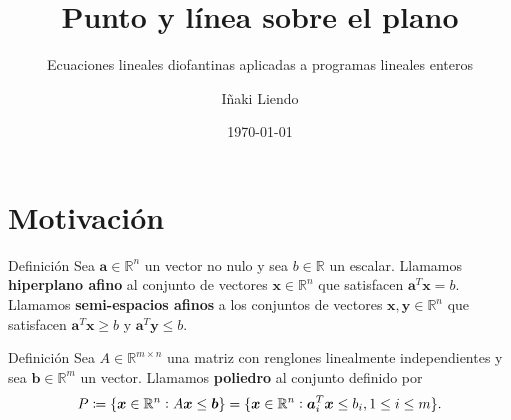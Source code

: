 \documentclass[aspectratio=169,professionalfonts]{beamer}
\title[Punto y línea sobre el plano]{Punto y línea sobre el plano}
\subtitle{Ecuaciones lineales diofantinas aplicadas a programas lineales enteros}
\author[Iñaki Liendo]{Iñaki Liendo}
\institute[ITAM]{Coloquio de matemáticas}
\date{\today}
\newcommand{\R}{\mathbb{R}}
\renewcommand{\vec}[1]{\boldsymbol{#1}}
\newcommand{\braces}[1]{\lbrace #1 \rbrace}
\begin{document}
\begin{frame}[plain]
	\titlepage
\end{frame}

\section{Motivación}
\begin{frame}
	\begin{block}{Definición}
		Sea $\vec{a} \in \R^n$ un vector no nulo y sea $b \in \R$ un escalar. Llamamos
		\textbf{hiperplano afino} al conjunto de vectores $\vec{x} \in \R^n$ que satisfacen
		$\vec{a}^T\vec{x} = b$. Llamamos \textbf{semi-espacios afinos} a los conjuntos de vectores
		$\vec{x}, \vec{y} \in \R^n$ que satisfacen $\vec{a}^T\vec{x} \geq b$ y $\vec{a}^T\vec{y}
		\leq b$.
	\end{block}
\end{frame}

\begin{frame}
	\begin{block}{Definición}
		Sea $A \in \R^{m \times n}$ una matriz con renglones linealmente independientes y sea
		$\vec{b} \in \R^m$ un vector. Llamamos \textbf{poliedro} al conjunto definido por
		\begin{equation*}
			P \coloneq \braces{\vec{x} \in \R^n \vcentcolon A\vec{x} \leq \vec{b}}
			= \braces{\vec{x} \in \R^n \vcentcolon \vec{a}^T_i\vec{x} \leq b_i, 1 \leq i \leq m}.
		\end{equation*}
	\end{block}
\end{frame}
\end{document}
